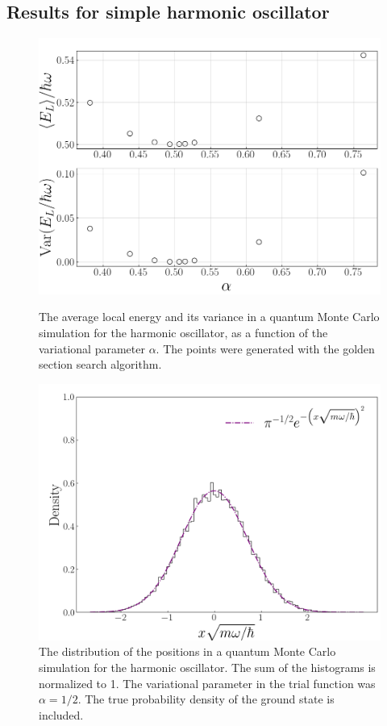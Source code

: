 \documentclass[twocolumn]{article}
\begin{document}
\begin{large}
\subsection*{Results for simple harmonic oscillator}
\begin{figure}[!t]
    \includegraphics[scale=0.35]{ParamsEnergyHarOsc.png}
    \caption{The average local energy and its variance in a quantum Monte Carlo simulation for the harmonic oscillator, as a function of the variational parameter $\alpha$. The points were generated with the golden section search algorithm.}
    \label{10apr1617}
    \includegraphics[scale=0.35]{DensityHarOsc.png}
    \caption{The distribution of the positions in a quantum Monte Carlo simulation for the harmonic oscillator. The sum of the histograms is normalized to 1. The variational parameter in the trial function was $\alpha=1/2$. The true probability density of the ground state is included.}

\end{figure}
\end{large}
\end{document}

